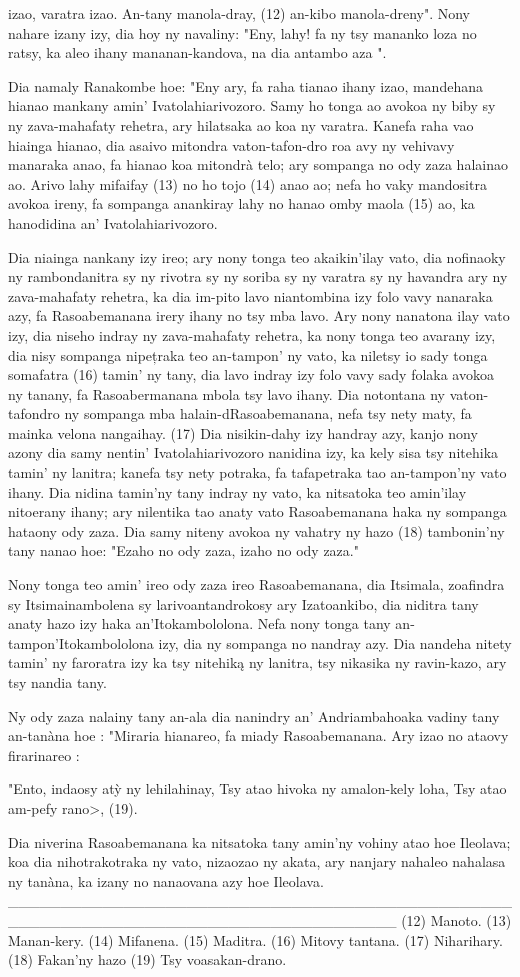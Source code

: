 izao, varatra izao. An-tany manola-dray, (12) an-kibo manola-dreny".
Nony nahare izany izy, dia hoy ny navaliny: "Eny, lahy! fa ny tsy mananko loza no ratsy, 
ka aleo ihany mananan-kandova, na dia antambo aza ".

Dia namaly Ranakombe hoe: "Eny ary, fa raha tianao ihany izao,
mandehana hianao mankany amin' Ivatolahiarivozoro. Samy ho tonga ao
avokoa ny biby sy ny zava-mahafaty rehetra, ary hilatsaka ao koa ny varatra. 
Kanefa raha vao hiainga hianao, dia asaivo mitondra vaton-tafon-dro roa avy ny vehivavy manaraka anao, 
fa hianao koa mitondrà telo; ary sompanga no ody zaza halainao ao.
Arivo lahy mifaifay (13) no ho tojo (14) anao ao; 
nefa ho vaky mandositra avokoa ireny, fa sompanga anankiray lahy no hanao omby maola (15) ao, 
ka hanodidina an' Ivatolahiarivozoro.

Dia niainga nankany izy ireo; ary nony tonga teo akaikin'ilay vato,
dia nofinaoky ny rambondanitra sy ny rivotra sy ny soriba sy ny varatra
sy ny havandra ary ny zava-mahafaty rehetra, ka dia im-pito lavo niantombina izy folo vavy nanaraka azy,
fa Rasoabemanana irery ihany no tsy mba lavo. 
Ary nony nanatona ilay vato izy, dia niseho indray ny zava-mahafaty rehetra, 
ka nony tonga teo avarany izy, dia nisy sompanga nipețraka teo an-tampon' ny vato, 
ka niletsy io sady tonga somafatra (16) tamin' ny tany, 
dia lavo indray izy folo vavy sady folaka avokoa ny tanany, fa Rasoabermanana mbola tsy lavo ihany. 
Dia notontana ny vaton-tafondro ny sompanga mba halain-dRasoabemanana, nefa tsy nety maty, fa mainka
velona nangaihay. (17) Dia nisikin-dahy izy handray azy, kanjo nony azony dia samy nentin' Ivatolahiarivozoro 
nanidina izy, ka kely sisa tsy nitehika tamin' ny lanitra; kanefa tsy nety potraka, 
fa tafapetraka tao an-tampon'ny vato ihany. Dia nidina tamin'ny tany indray ny vato, ka nitsatoka
teo amin'ilay nitoerany ihany; ary nilentika tao anaty vato Rasoabemanana haka ny sompanga hataony ody zaza. 
Dia samy niteny avokoa ny vahatry ny hazo (18) tambonin'ny tany nanao hoe: "Ezaho no ody zaza, izaho no ody zaza."

Nony tonga teo amin' ireo ody zaza ireo Rasoabemanana, dia Itsimala,
zoafindra sy Itsimainambolena sy larivoantandrokosy ary Izatoankibo, dia
niditra tany anaty hazo izy haka an'Itokambololona. Nefa nony tonga
tany an-tampon'Itokambololona izy, dia ny sompanga no nandray azy.
Dia nandeha nitety tamin' ny faroratra izy ka tsy nitehiką ny lanitra, tsy
nikasika ny ravin-kazo, ary tsy nandia tany.

Ny ody zaza nalainy tany an-ala dia nanindry an' Andriambahoaka
vadiny tany an-tanàna hoe : "Miraria hianareo, fa miady Rasoabemanana.
Ary izao no ataovy firarinareo :

"Ento, indaosy atỳ ny lehilahinay,
Tsy atao hivoka ny amalon-kely loha,
Tsy atao am-pefy rano>, (19).

Dia niverina Rasoabemanana ka nitsatoka tany amin'ny vohiny atao
hoe Ileolava; koa dia nihotrakotraka ny vato, nizaozao ny akata, ary nanjary
nahaleo nahalasa ny tanàna, ka izany no nanaovana azy hoe Ileolava.
_____________________________________________________________________________________
(12) Manoto. 
(13) Manan-kery. 
(14) Mifanena. 
(15) Maditra. 
(16) Mitovy tantana. 
(17) Niharihary. 
(18) Fakan'ny hazo 
(19) Tsy voasakan-drano.